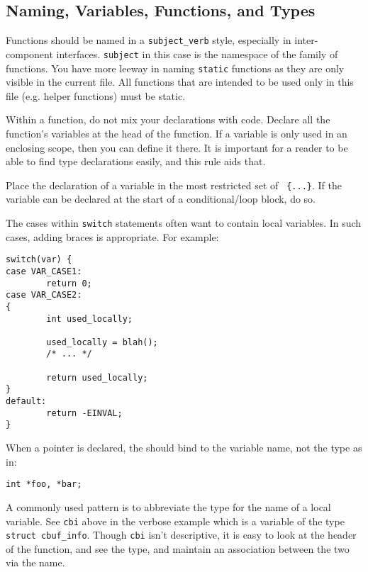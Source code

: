 \documentclass[11pt,onecolumn]{article}
\newcommand{\head}[1]{\vspace{0.4em}\noindent{\bf #1}}
\begin{document}
\subsection{Naming, Variables, Functions, and Types}

Functions should be named in a {\tt subject\_verb} style, especially
in inter-component interfaces.  {\tt subject} in this case is the
namespace of the family of functions.  You have more leeway in naming
{\tt static} functions as they are only visible in the current file.
All functions that are intended to be used only in this file
(e.g. helper functions) must be static.

\head{Variables.} Within a function, do not mix your declarations with
code.  Declare all the function's variables at the head of the
function.  If a variable is only used in an enclosing scope, then you
can define it there.  It is important for a reader to be able to find
type declarations easily, and this rule aids that.

Place the declaration of a variable in the most restricted set of {\tt
  \{...\}}.  If the variable can be declared at the start of a
conditional/loop block, do so.

The cases within {\tt switch} statements often want to contain local
variables.  In such cases, adding braces is appropriate.  For example:

    \begin{minipage}{3in}
      \footnotesize
      \lstset{language=C}
      \begin{lstlisting}
switch(var) {
case VAR_CASE1:
        return 0;
case VAR_CASE2:
{
        int used_locally;

        used_locally = blah();
        /* ... */

        return used_locally;
}
default:
        return -EINVAL;
}
      \end{lstlisting}
    \end{minipage}

When a pointer is declared, the {\tt *} should bind to the variable
name, not the type as in:

    \begin{minipage}{3in}
      \footnotesize
      \lstset{language=C}
      \begin{lstlisting}
int *foo, *bar;
      \end{lstlisting}
    \end{minipage}

A commonly used pattern is to abbreviate the type for the name of a
local variable.  See {\tt cbi} above in the verbose example which is a
variable of the type {\tt struct cbuf\_info}.  Though {\tt cbi} isn't
descriptive, it is easy to look at the header of the function, and see
the type, and maintain an association between the two via the name.
\end{document}
